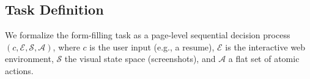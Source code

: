 \documentclass[sigconf, screen, review]{acmart}
\begin{document}






\subsection{Task Definition}

We formalize the form-filling task as a page-level sequential decision process $(c, \mathcal{E}, \mathcal{S}, \mathcal{A})$, where $c$ is the user input (e.g., a resume), $\mathcal{E}$ is the interactive web environment, $\mathcal{S}$ the visual state space (screenshots), and $\mathcal{A}$ a flat set of atomic actions.
\end{document}
